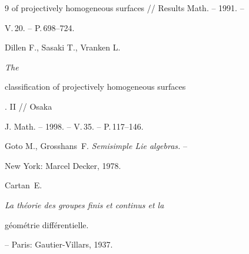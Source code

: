 \begin{thebibliography}{9}
{of projectively homogeneous surfaces} // Results Math. -- 1991. --


V.\,20. -- P.\,698--724.





 Dillen F., Sasaki T., Vranken L. {\em The


classification of projectively homogeneous surfaces}. II // Osaka


J. Math. -- 1998. -- V.\,35. -- P.\,117--146.





 Goto M., Grosshans~F. {\em Semisimple Lie algebras.} --


New York: Marcel Decker, 1978.





\end{thebibliography}





\vskip 2cm












\label{end}



















Cartan~E. {\em La th\'eorie des groupes finis et continus et la


g\'eom\'etrie diff\'erentielle.} -- Paris: Gautier-Villars, 1937.








